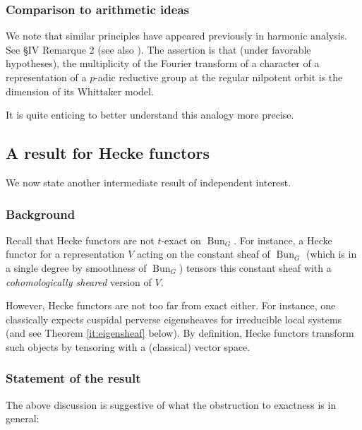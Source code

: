 \documentclass[reqno,11pt]{amsart}
\numberwithin{equation}{subsection}
\theoremstyle{remark}
\newcommand{\on}{\operatorname}
\newcommand{\Bun}{\on{Bun}}
\begin{document}
\subsubsection{Comparison to arithmetic ideas}

We note that similar principles have appeared previously in 
harmonic analysis. See \cite{rodier-characters} \S IV Remarque 2 (see also
\cite{moeglin-waldspurger}). The assertion is that
(under favorable hypotheses), the multiplicity of the Fourier transform of a character
of a representation of a $p$-adic reductive group 
at the regular nilpotent orbit is the dimension
of its Whittaker model. 

It is quite enticing to better understand this analogy more precise.

\subsection{A result for Hecke functors}

We now state another intermediate result of independent interest.

\subsubsection{Background}

Recall that Hecke functors are not $t$-exact on $\Bun_G$.
For instance, a Hecke functor for a representation $V$ 
acting on the constant sheaf of $\Bun_G$ (which is in a single 
degree by smoothness of $\Bun_G$) tensors this constant
sheaf with a \emph{cohomologically sheared} version of $V$. 

However, Hecke functors are not too far from exact either.
For instance, one classically expects cuspidal perverse eigensheaves
for irreducible local systems (and see Theorem \ref{it:eigensheaf} below).
By definition, Hecke functors
transform such objects by tensoring with a (classical) vector space.

\subsubsection{Statement of the result}

The above discussion is suggestive of what the obstruction to exactness is
in general:
\end{document}
